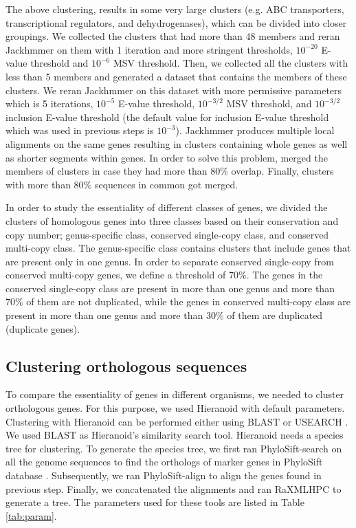 \documentclass[12pt,letterpaper]{article}
\begin{document}
The above clustering, results in some very large clusters (e.g. ABC transporters, transcriptional regulators, and dehydrogenases), which can be divided into closer groupings. We collected the clusters that had more than 48 members and reran Jackhmmer on them with 1 iteration and more stringent thresholds, $10^{-20}$ E-value threshold and $10^{-6}$ MSV threshold. Then, we collected all the clusters with less than 5 members and generated a dataset that contains the members of these clusters. We reran Jackhmmer on this dataset with more permissive parameters which is 5 iterations, $10^{-5}$ E-value threshold, $10^{-3/2}$ MSV threshold, and $10^{-3/2}$ inclusion E-value threshold (the default value for inclusion E-value threshold which was used in previous steps is $10^{-3}$). Jackhmmer produces multiple local alignments on the same genes resulting in clusters containing whole genes as well as shorter segments within genes. In order to solve this problem, merged the members of clusters in case they had more than $80\%$ overlap. Finally, clusters with more than $80\%$ sequences in common got merged.

In order to study the essentiality of different classes of genes, we divided the clusters of homologous genes into three classes based on their conservation and copy number; genus-specific class, conserved single-copy class, and conserved multi-copy class. The genus-specific class contains clusters that include genes that are present only in one genus. In order to separate conserved single-copy from conserved multi-copy genes, we define a threshold of $70\%$. %
The genes in the conserved single-copy class are present in more than one genus and more than $70\%$ of them are not duplicated, while the genes in conserved multi-copy class are present in more than one genus and more than $30\%$ of them are duplicated (duplicate genes).

\subsection{Clustering orthologous sequences}\label{meth:ortholog}
To compare the essentiality of genes in different organisms, we needed to cluster orthologous genes. For this purpose, we used Hieranoid \cite{schreiber_hieranoid:_2013} with default parameters. Clustering with Hieranoid can be performed either using BLAST \cite{altschul_basic_1990, altschul_gapped_1997} or USEARCH \cite{edgar_search_2010}. We used BLAST as Hieranoid's similarity search tool. Hieranoid needs a species tree for clustering. To generate the species tree, we first ran PhyloSift-search on all the genome sequences to find the orthologs of marker genes in PhyloSift database \cite{darling_phylosift:_2014}. Subsequently, we ran PhyloSift-align to align the genes found in previous step. Finally, we concatenated the alignments and ran RaXMLHPC \cite{stamatakis_raxml_2014} to generate a tree. The parameters used for these tools are listed in Table \ref{tab:param}.
\end{document}
